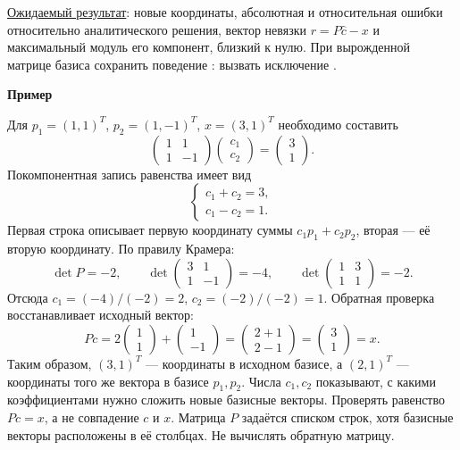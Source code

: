 \documentclass[12pt,a4paper]{article}
\newcommand{\taskhead}[1]{\par\textbf{#1}\par}
\begin{document}
\underline{Ожидаемый результат}: новые координаты, абсолютная и относительная ошибки относительно
аналитического решения, вектор невязки $r=P\widehat c-x$ и максимальный
модуль его компонент, близкий к нулю. При вырожденной матрице базиса сохранить поведение
: вызвать исключение .


\taskhead{Пример}
Для $p_1=(1,1)^T$, $p_2=(1,-1)^T$, $x=(3,1)^T$ необходимо составить
\[
\begin{pmatrix}1&1\\1&-1\end{pmatrix}
\begin{pmatrix}c_1\\c_2\end{pmatrix}
=\begin{pmatrix}3\\1\end{pmatrix}.
\]
Покомпонентная запись равенства имеет вид
\[
\begin{cases}c_1+c_2=3,\\c_1-c_2=1.\end{cases}
\]
Первая строка описывает первую координату суммы $c_1p_1+c_2p_2$,
вторая --- её вторую координату. По правилу Крамера:
\[
\det P=-2,\qquad
\det\begin{pmatrix}3&1\\1&-1\end{pmatrix}=-4,\qquad
\det\begin{pmatrix}1&3\\1&1\end{pmatrix}=-2.
\]
Отсюда $c_1=(-4)/(-2)=2$, $c_2=(-2)/(-2)=1$.
Обратная проверка восстанавливает исходный вектор:
\[
Pc=2\begin{pmatrix}1\\1\end{pmatrix}
+\begin{pmatrix}1\\-1\end{pmatrix}
=\begin{pmatrix}2+1\\2-1\end{pmatrix}
=\begin{pmatrix}3\\1\end{pmatrix}=x.
\]
Таким образом, $(3,1)^T$ --- координаты в исходном базисе,
а $(2,1)^T$ --- координаты того же вектора в базисе $p_1,p_2$.
Числа $c_1,c_2$ показывают, с какими коэффициентами нужно сложить новые
базисные векторы. Проверять равенство $Pc=x$, а не совпадение $c$ и $x$.
Матрица $P$ задаётся списком строк, хотя базисные векторы расположены
в её столбцах. Не вычислять обратную матрицу.
\end{document}

